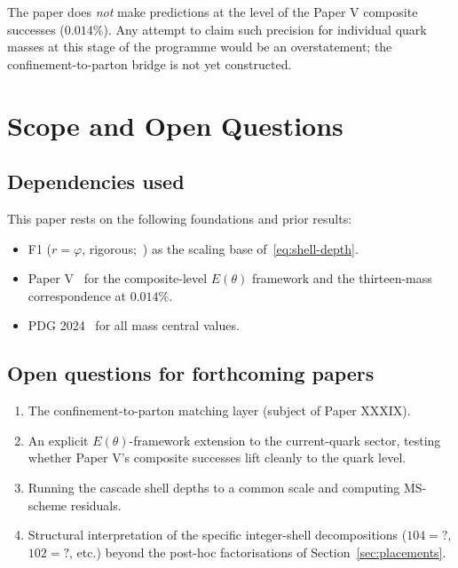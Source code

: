 \documentclass[12pt]{article}
\theoremstyle{definition}
\theoremstyle{remark}
\newcommand{\MSbar}{\overline{\mathrm{MS}}}
\begin{document}
The paper does \emph{not} make predictions at the level of the Paper V composite successes ($0.014\%$). Any attempt to claim such precision for individual quark masses at this stage of the programme would be an overstatement; the confinement-to-parton bridge is not yet constructed.

\section{Scope and Open Questions}\label{sec:scope}

\subsection{Dependencies used}
This paper rests on the following foundations and prior results:
\begin{itemize}
\item F1 ($r = \varphi$, rigorous;~\citep{SmartXXXVI}) as the scaling base of~\eqref{eq:shell-depth}.
\item Paper V~\citep{SmartV} for the composite-level $E(\theta)$ framework and the thirteen-mass correspondence at $0.014\%$.
\item PDG 2024~\citep{PDG2024} for all mass central values.
\end{itemize}

\subsection{Open questions for forthcoming papers}
\begin{enumerate}
\item The confinement-to-parton matching layer (subject of Paper XXXIX).
\item An explicit $E(\theta)$-framework extension to the current-quark sector, testing whether Paper V's composite successes lift cleanly to the quark level.
\item Running the cascade shell depths to a common scale and computing $\MSbar$-scheme residuals.
\item Structural interpretation of the specific integer-shell decompositions ($104 = ?$, $102 = ?$, etc.) beyond the post-hoc factorisations of Section~\ref{sec:placements}.
\end{enumerate}
\end{document}
